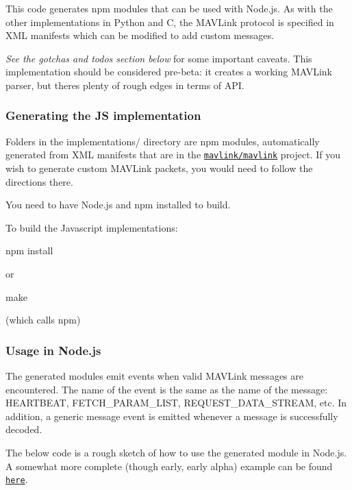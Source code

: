 This code generates {\ttfamily npm} modules that can be used with Node.\+js. As with the other implementations in Python and C, the M\+A\+V\+Link protocol is specified in X\+ML manifests which can be modified to add custom messages.

{\itshape See the gotcha\textquotesingle{}s and todo\textquotesingle{}s section below} for some important caveats. This implementation should be considered pre-\/beta\+: it creates a working M\+A\+V\+Link parser, but there\textquotesingle{}s plenty of rough edges in terms of A\+PI.

\subsubsection*{Generating the JS implementation}

Folders in the {\ttfamily implementations/} directory are {\ttfamily npm} modules, automatically generated from X\+ML manifests that are in the \href{https://github.com/mavlink/mavlink}{\tt mavlink/mavlink} project. If you wish to generate custom M\+A\+V\+Link packets, you would need to follow the directions there.

You need to have Node.\+js and npm installed to build.

To build the Javascript implementations\+:


\begin{DoxyCode}
npm install
\end{DoxyCode}


or


\begin{DoxyCode}
make
\end{DoxyCode}


(which calls npm)

\subsubsection*{Usage in Node.\+js}

The generated modules emit events when valid M\+A\+V\+Link messages are encountered. The name of the event is the same as the name of the message\+: {\ttfamily H\+E\+A\+R\+T\+B\+E\+AT}, {\ttfamily F\+E\+T\+C\+H\+\_\+\+P\+A\+R\+A\+M\+\_\+\+L\+I\+ST}, {\ttfamily R\+E\+Q\+U\+E\+S\+T\+\_\+\+D\+A\+T\+A\+\_\+\+S\+T\+R\+E\+AM}, etc. In addition, a generic {\ttfamily message} event is emitted whenever a message is successfully decoded.

The below code is a rough sketch of how to use the generated module in Node.\+js. A somewhat more complete (though early, early alpha) example can be found \href{https://github.com/acuasi/ground-control-station}{\tt here}.

